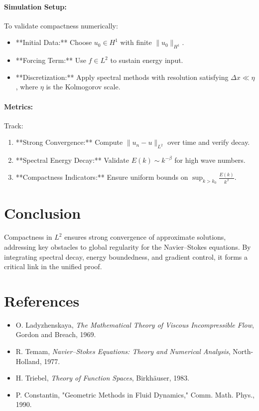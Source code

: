 \paragraph{Simulation Setup:}
To validate compactness numerically:
\begin{itemize}
    \item **Initial Data:** Choose $u_0 \in H^1$ with finite $\|u_0\|_{H^1}$.
    \item **Forcing Term:** Use $f \in L^2$ to sustain energy input.
    \item **Discretization:** Apply spectral methods with resolution satisfying $\Delta x \ll \eta$, where $\eta$ is the Kolmogorov scale.
\end{itemize}

\paragraph{Metrics:}
Track:
\begin{enumerate}
    \item **Strong Convergence:** Compute $\|u_n - u\|_{L^2}$ over time and verify decay.
    \item **Spectral Energy Decay:** Validate $E(k) \sim k^{-\beta}$ for high wave numbers.
    \item **Compactness Indicators:** Ensure uniform bounds on $\sup_{k > k_0} \frac{E(k)}{k^\beta}$.
\end{enumerate}

\section*{Conclusion}
Compactness in $L^2$ ensures strong convergence of approximate solutions, addressing key obstacles to global regularity for the Navier--Stokes equations. By integrating spectral decay, energy boundedness, and gradient control, it forms a critical link in the unified proof.

\section*{References}
\begin{itemize}
    \item O. Ladyzhenskaya, \emph{The Mathematical Theory of Viscous Incompressible Flow}, Gordon and Breach, 1969.
    \item R. Temam, \emph{Navier--Stokes Equations: Theory and Numerical Analysis}, North-Holland, 1977.
    \item H. Triebel, \emph{Theory of Function Spaces}, Birkh\"auser, 1983.
    \item P. Constantin, "Geometric Methods in Fluid Dynamics," Comm. Math. Phys., 1990.
\end{itemize}

